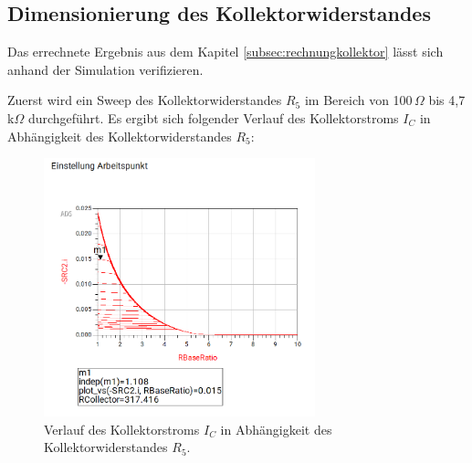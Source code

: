 \subsection{Dimensionierung des Kollektorwiderstandes}
\label{sec:dimensionierung_kollektorwiderstand}
%
%

Das errechnete Ergebnis aus dem Kapitel \ref{subsec:rechnungkollektor} lässt sich anhand der Simulation verifizieren. 

Zuerst wird ein Sweep des Kollektorwiderstandes $R_5$ im Bereich von 100\,\(\Omega\) bis 4,7\,k\(\Omega\) durchgeführt.
Es ergibt sich folgender Verlauf des Kollektorstroms $I_C$ in Abhängigkeit des Kollektorwiderstandes $R_5$:
\begin{figure}[H]
    \centering
    \includegraphics[width=0.7\textwidth]{Pictures/RCollector.png}
    \caption{Verlauf des Kollektorstroms $I_C$ in Abhängigkeit des Kollektorwiderstandes $R_5$.}
    \label{fig:RCollector}
\end{figure}

